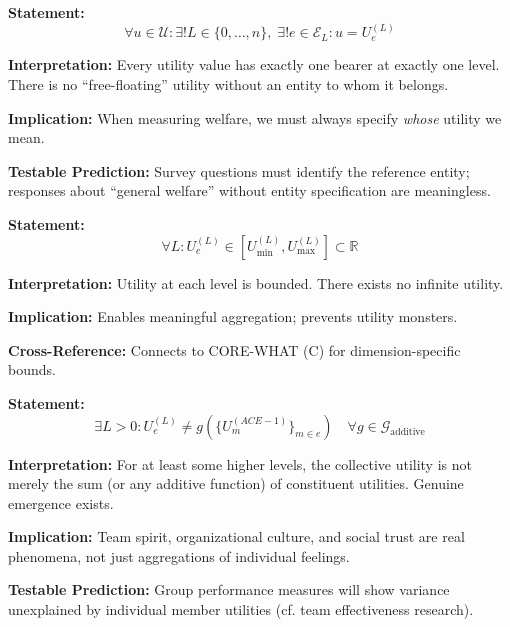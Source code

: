 \begin{tcolorbox}[colback=gray!5!white, colframe=gray!75!black,
    title=Axiom UNMAPPED_SRL-1: Existence of Utility Bearer]
\textbf{Statement:}
\begin{equation}
\forall u \in \mathcal{U}: \exists! L \in \{0, \ldots, n\}, \; \exists! e \in \mathcal{E}_L: u = U_e^{(L)}
\end{equation}

\textbf{Interpretation:} Every utility value has exactly one bearer at exactly one level.
There is no ``free-floating'' utility without an entity to whom it belongs.

\textbf{Implication:} When measuring welfare, we must always specify \textit{whose} utility we mean.

\textbf{Testable Prediction:} Survey questions must identify the reference entity;
responses about ``general welfare'' without entity specification are meaningless.
\end{tcolorbox}

\begin{tcolorbox}[colback=gray!5!white, colframe=gray!75!black,
    title=Axiom UNMAPPED_SRL-2: Level Boundedness]
\textbf{Statement:}
\begin{equation}
\forall L: U_e^{(L)} \in [U_{\min}^{(L)}, U_{\max}^{(L)}] \subset \mathbb{R}
\end{equation}

\textbf{Interpretation:} Utility at each level is bounded. There exists no infinite utility.

\textbf{Implication:} Enables meaningful aggregation; prevents utility monsters.

\textbf{Cross-Reference:} Connects to CORE-WHAT (C) for dimension-specific bounds.
\end{tcolorbox}

\begin{tcolorbox}[colback=gray!5!white, colframe=gray!75!black,
    title=Axiom UNMAPPED_SRL-3: Non-Trivial Emergence]
\textbf{Statement:}
\begin{equation}
\exists L > 0: U_e^{(L)} \neq g\left(\{U_m^{(ACE-1)}\}_{m \in e}\right) \quad \forall g \in \mathcal{G}_{\text{additive}}
\end{equation}

\textbf{Interpretation:} For at least some higher levels, the collective utility is not merely
the sum (or any additive function) of constituent utilities. Genuine emergence exists.

\textbf{Implication:} Team spirit, organizational culture, and social trust are real phenomena,
not just aggregations of individual feelings.

\textbf{Testable Prediction:} Group performance measures will show variance unexplained
by individual member utilities (cf. team effectiveness research).
\end{tcolorbox}

